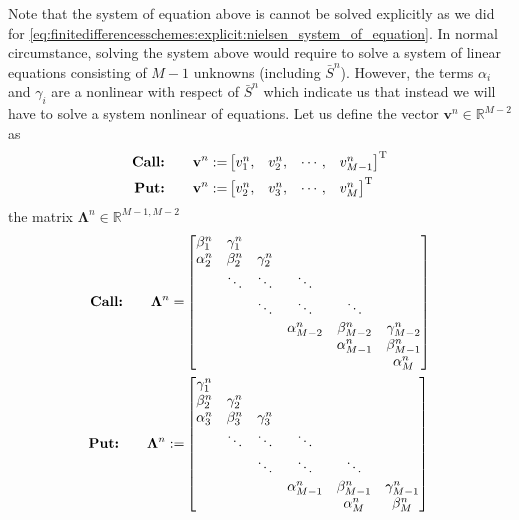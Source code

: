 Note that the system of equation above is cannot be solved explicitly as we did for \eqref{eq:finitedifferencesschemes:explicit:nielsen_system_of_equation}. In normal circumstance, solving the system above would require to solve a system of linear equations consisting of $M-1$ unknowns (including $\bar{S}^{n}$). However, the terms $\alpha_i$ and $\gamma_i$ are a nonlinear with respect of $\bar{S}^{n}$ which indicate us that instead we will have to solve a system nonlinear of equations. Let us define the vector $\mathbf{v}^n \in \mathbb{R}^{M-2}$ as
\begin{subequations}
  \begin{align}
    \text{\textbf{Call:}} \qquad \mathbf{v}^{n} :=& \begin{bmatrix}
      v^{n}_{1}, & v^{n}_{2}, & \cdots, & v^{n}_{M-1}
    \end{bmatrix}^{\text{T}}\\
    \text{\textbf{Put:}} \qquad \mathbf{v}^{n} :=& \begin{bmatrix}
      v^{n}_{2}, & v^{n}_{3}, & \cdots, & v^{n}_{M}
    \end{bmatrix}^{\text{T}}
  \end{align}    
\end{subequations}
the matrix $\mathbf{\Lambda}^{n} \in \mathbb{R}^{M-1,M-2}$ 
{
  \allowdisplaybreaks  
\begin{subequations}
  \begin{align}
    \text{\textbf{Call:}} \qquad \mathbf{\Lambda}^{n} =& \begin{bmatrix}
      \beta^{n}_{1} & \gamma^{n}_1 \\
      \alpha^{n}_{2} & \beta^{n}_{2} & \gamma^{n}_{2} \\
      & \ddots & \ddots & \ddots  \\
      & & \ddots & \ddots & \ddots  \\
      & & & \alpha^{n}_{M-2} & \beta^{n}_{M-2} & \gamma^{n}_{M-2} \\
      & & & & \alpha^{n}_{M-1} & \beta^{n}_{M-1} \\
      & & & & & \alpha^{n}_{M} \\
    \end{bmatrix}\\
    \text{\textbf{Put:}} \qquad  \mathbf{\Lambda}^{n} :=& \begin{bmatrix}
      \gamma^{n}_1 \\
      \beta^{n}_2 & \gamma^{n}_2 \\
      \alpha^{n}_3 & \beta^{n}_3 & \gamma^{n}_3 \\
      & \ddots & \ddots & \ddots \\
      & & \ddots & \ddots & \ddots \\
      & & & \alpha^{n}_{M-1} & \beta^{n}_{M-1} & \gamma^{n}_{M-1} \\
      & & & & \alpha^{n}_{M} & \beta^{n}_{M} \\
    \end{bmatrix}
  \end{align}
\end{subequations}
}
